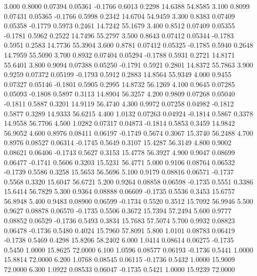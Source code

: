    3.000   0.8000   0.07394   0.05361  -0.1766   0.6013   0.2298  14.6388  54.8585
   3.100   0.8099   0.07431   0.05365  -0.1766   0.5998   0.2342  14.6704  54.9459
   3.300   0.8383   0.07409   0.05358  -0.1779   0.5973   0.2461  14.7242  55.1679
   3.400   0.8512   0.07409   0.05355  -0.1781   0.5962   0.2522  14.7496  55.2797
   3.500   0.8643   0.07412   0.05344  -0.1783   0.5951   0.2583  14.7736  55.3904
   3.600   0.8781   0.07412   0.05325  -0.1785   0.5940   0.2648  14.7959  55.5090
   3.700   0.8932   0.07404   0.05294  -0.1788   0.5931   0.2721  14.8171  55.6401
   3.800   0.9094   0.07388   0.05250  -0.1791   0.5921   0.2801  14.8372  55.7863
   3.900   0.9259   0.07372   0.05199  -0.1793   0.5912   0.2883  14.8564  55.9349
   4.000   0.9455   0.07327   0.05146  -0.1801   0.5905   0.2995  14.8732  56.1269
   4.100   0.9645   0.07285   0.05093  -0.1808   0.5897   0.3113  14.8904  56.3257
   4.200   0.9809   0.07268   0.05040  -0.1811   0.5887   0.3201  14.9119  56.4740
   4.300   0.9972   0.07258   0.04982  -0.1812   0.5877   0.3289  14.9333  56.6215
   4.400   1.0132   0.07263   0.04924  -0.1814   0.5867   0.3378  14.9558  56.7706
   4.500   1.0282   0.07317   0.04873  -0.1814   0.5853   0.3459  14.9842  56.9052
   4.600   0.8976   0.08411   0.06197  -0.1749   0.5674   0.3067  15.3740  56.2488
   4.700   0.8976   0.08527   0.06314  -0.1745   0.5649   0.3107  15.4287  56.3149
   4.800   0.9002   0.08621   0.06406  -0.1743   0.5627   0.3153  15.4778  56.3927
   4.900   0.9047   0.08699   0.06477  -0.1741   0.5606   0.3203  15.5231  56.4771
   5.000   0.9106   0.08764   0.06532  -0.1739   0.5586   0.3258  15.5653  56.5696
   5.100   0.9179   0.08816   0.06571  -0.1737   0.5568   0.3320  15.6047  56.6721
   5.200   0.9264   0.08858   0.06598  -0.1735   0.5551   0.3386  15.6414  56.7829
   5.300   0.9364   0.08888   0.06609  -0.1735   0.5536   0.3453  15.6757  56.8948
   5.400   0.9483   0.08900   0.06599  -0.1734   0.5520   0.3512  15.7092  56.9946
   5.500   0.9627   0.08878   0.06570  -0.1735   0.5506   0.3672  15.7394  57.2494
   5.600   0.9777   0.08852   0.06529  -0.1736   0.5493   0.3834  15.7683  57.5074
   5.700   0.9932   0.08823   0.06478  -0.1736   0.5480   0.4024  15.7960  57.8091
   5.800   1.0101   0.08783   0.06419  -0.1738   0.5469   0.4298  15.8206  58.2402
   6.000   1.0414   0.08614   0.06275  -0.1735   0.5450   1.0000  15.8625  72.0000
   6.100   1.0596   0.08577   0.06193  -0.1736   0.5441   1.0000  15.8814  72.0000
   6.200   1.0768   0.08545   0.06115  -0.1736   0.5432   1.0000  15.9009  72.0000
   6.300   1.0922   0.08533   0.06047  -0.1735   0.5421   1.0000  15.9239  72.0000
